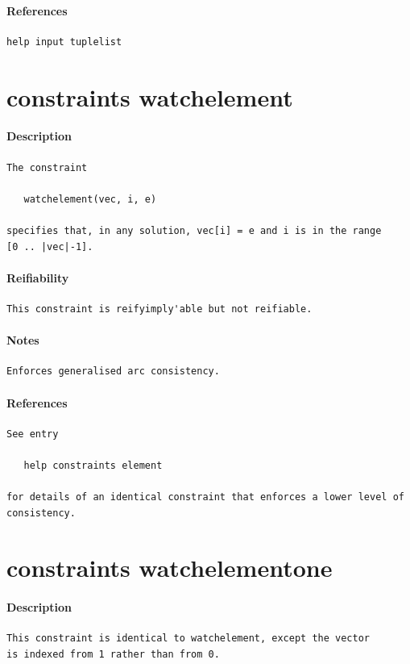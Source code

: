 \documentclass[oneside]{book}
\begin{document}
\paragraph{References}
{\footnotesize
\begin{verbatim}
help input tuplelist
\end{verbatim}
}
\section{constraints watchelement}
\paragraph{Description}
{\footnotesize
\begin{verbatim}
The constraint 

   watchelement(vec, i, e)

specifies that, in any solution, vec[i] = e and i is in the range 
[0 .. |vec|-1].
\end{verbatim}
}
\paragraph{Reifiability}
{\footnotesize
\begin{verbatim}
This constraint is reifyimply'able but not reifiable.
\end{verbatim}
}
\paragraph{Notes}
{\footnotesize
\begin{verbatim}
Enforces generalised arc consistency.
\end{verbatim}
}
\paragraph{References}
{\footnotesize
\begin{verbatim}
See entry

   help constraints element

for details of an identical constraint that enforces a lower level of
consistency.
\end{verbatim}
}
\section{constraints watchelement\textunderscore one}
\paragraph{Description}
{\footnotesize
\begin{verbatim}
This constraint is identical to watchelement, except the vector
is indexed from 1 rather than from 0.
\end{verbatim}
}
\end{document}
